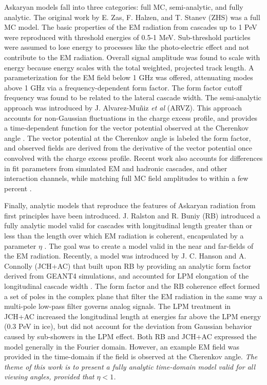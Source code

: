 \documentclass[amsmath,amssymb,aps,prd,10pt,twocolumn]{revtex4}
\begin{document}
Askaryan models fall into three categories: full MC, semi-analytic, and fully analytic.  The original work by E. Zas, F. Halzen, and T. Stanev (ZHS) \cite{zhs} was a full MC model.  The basic properties of the EM radiation from cascades up to 1 PeV were reproduced with threshold energies of 0.5-1 MeV.  Sub-threshold particles were assumed to lose energy to processes like the photo-electric effect and not contribute to the EM radiation.  Overall signal amplitude was found to scale with energy because energy scales with the total weighted, projected track length.  A parameterization for the EM field below 1 GHz was offered, attenuating modes above 1 GHz via a frequency-dependent form factor.  The form factor cutoff frequency was found to be related to the lateral cascade width.  The semi-analytic approach was introduced by J. Alvarez-Mu\~{n}iz \textit{et al} (ARVZ).  This approach accounts for non-Gaussian fluctuations in the charge excess profile, and provides a time-dependent function for the vector potential observed at the Cherenkov angle \cite{10.1103/physrevd.84.103003}.  The vector potential at the Cherenkov angle is labeled the form factor, and observed fields are derived from the derivative of the vector potential once convolved with the charge excess profile.  Recent work also accounts for differences in fit parameters from simulated EM and hadronic cascades, and other interaction channels, while matching full MC field amplitudes to within a few percent \cite{PhysRevD.101.083005}.

Finally, analytic models that reproduce the features of Askaryan radiation from first principles have been introduced.  J. Ralston and R. Buniy (RB) introduced a fully analytic model valid for cascades with longitudinal length greater than or less than the length over which EM radiation is coherent, encapsulated by a parameter $\eta$ \cite{10.1103/physrevd.65.016003}.  The goal was to create a model valid in the near and far-fields of the EM radiation.  Recently, a model was introduced by J. C. Hanson and A. Connolly (JCH+AC) that built upon RB by providing an analytic form factor derived from GEANT4 simulations, and accounted for LPM elongation of the longitudinal cascade width \cite{10.1016/j.astropartphys.2017.03.008}.  The form factor and the RB coherence effect formed a set of poles in the complex plane that filter the EM radiation in the same way a multi-pole low-pass filter governs analog signals.  The LPM treatment in JCH+AC increased the longitudinal length at energies far above the LPM energy (0.3 PeV in ice), but did not account for the deviation from Gaussian behavior caused by sub-showers in the LPM effect.  Both RB and JCH+AC expressed the model generally in the Fourier domain.  However, an example EM field was provided in the time-domain if the field is observed at the Cherenkov angle.  \textit{The theme of this work is to present a fully analytic time-domain model valid for all viewing angles, provided that $\eta < 1$.}
\end{document}
